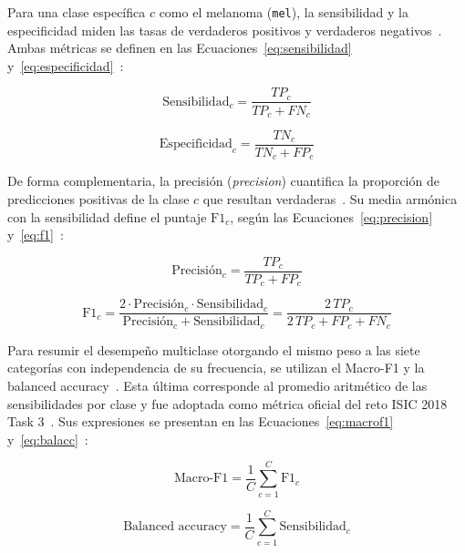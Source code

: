 Para una clase específica $c$ como el melanoma (\texttt{mel}), la sensibilidad y la especificidad miden las tasas de verdaderos positivos y verdaderos negativos~\cite{maierhein2024metrics}. Ambas métricas se definen en las Ecuaciones~\ref{eq:sensibilidad} y~\ref{eq:especificidad}~\cite{maierhein2024metrics}:

\begin{equation}
  \text{Sensibilidad}_c = \frac{TP_c}{TP_c + FN_c}
  \label{eq:sensibilidad}
\end{equation}

\begin{equation}
  \text{Especificidad}_c = \frac{TN_c}{TN_c + FP_c}
  \label{eq:especificidad}
\end{equation}

De forma complementaria, la precisión (\textit{precision}) cuantifica la proporción de predicciones positivas de la clase $c$ que resultan verdaderas~\cite{maierhein2024metrics}. Su media armónica con la sensibilidad define el puntaje $\text{F1}_c$, según las Ecuaciones~\ref{eq:precision} y~\ref{eq:f1}~\cite{maierhein2024metrics}:

\begin{equation}
  \text{Precisión}_c = \frac{TP_c}{TP_c + FP_c}
  \label{eq:precision}
\end{equation}

\begin{equation}
  \text{F1}_c = \frac{2 \cdot \text{Precisión}_c \cdot \text{Sensibilidad}_c}{\text{Precisión}_c + \text{Sensibilidad}_c} = \frac{2\,TP_c}{2\,TP_c + FP_c + FN_c}
  \label{eq:f1}
\end{equation}

Para resumir el desempeño multiclase otorgando el mismo peso a las siete categorías con independencia de su frecuencia, se utilizan el Macro-F1 y la balanced accuracy~\cite{maierhein2024metrics}. Esta última corresponde al promedio aritmético de las sensibilidades por clase y fue adoptada como métrica oficial del reto ISIC 2018 Task 3~\cite{codella2019isic2018}. Sus expresiones se presentan en las Ecuaciones~\ref{eq:macrof1} y~\ref{eq:balacc}~\cite{maierhein2024metrics,codella2019isic2018}:

\begin{equation}
  \text{Macro-F1} = \frac{1}{C} \sum_{c=1}^{C} \text{F1}_c
  \label{eq:macrof1}
\end{equation}

\begin{equation}
  \text{Balanced accuracy} = \frac{1}{C} \sum_{c=1}^{C} \text{Sensibilidad}_c
  \label{eq:balacc}
\end{equation}

